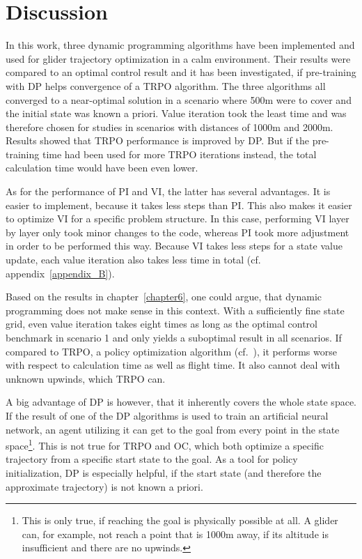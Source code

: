 \chapter{Discussion}
\label{chapter7}
In this work, three dynamic programming algorithms have been implemented and used for glider trajectory optimization in a calm environment. Their results were compared to an optimal control result and it has been investigated, if pre-training with DP helps convergence of a TRPO algorithm. The three algorithms all converged to a near-optimal solution in a scenario where 500m were to cover and the initial state was known a priori. Value iteration took the least time and was therefore chosen for studies in scenarios with distances of 1000m and 2000m. Results showed that TRPO performance is improved by DP. But if the pre-training time had been used for more TRPO iterations instead, the total calculation time would have been even lower.

As for the performance of PI and VI, the latter has several advantages. It is easier to implement, because it takes less steps than PI. This also makes it easier to optimize VI for a specific problem structure. In this case, performing VI layer by layer only took minor changes to the code, whereas PI took more adjustment in order to be performed this way. Because VI takes less steps for a state value update, each value iteration also takes less time in total (cf. appendix~\ref{appendix_B}).

Based on the results in chapter~\ref{chapter6}, one could argue, that dynamic programming does not make sense in this context. With a sufficiently fine state grid, even value iteration takes eight times as long as the optimal control benchmark in scenario 1 and only yields a suboptimal result in all scenarios. If compared to TRPO, a policy optimization algorithm (cf.~\cite{Zuern2017}), it performs worse with respect to calculation time as well as flight time. It also cannot deal with unknown upwinds, which TRPO can.

A big advantage of DP is however, that it inherently covers the whole state space. If the result of one of the DP algorithms is used to train an artificial neural network, an agent utilizing it can get to the goal from every point in the state space\footnote{This is only true, if reaching the goal is physically possible at all. A glider can, for example, not reach a point that is 1000m away, if its altitude is insufficient and there are no upwinds.}. This is not true for TRPO and OC, which both optimize a specific trajectory from a specific start state to the goal. As a tool for policy initialization, DP is especially helpful, if the start state (and therefore the approximate trajectory) is not known a priori.

